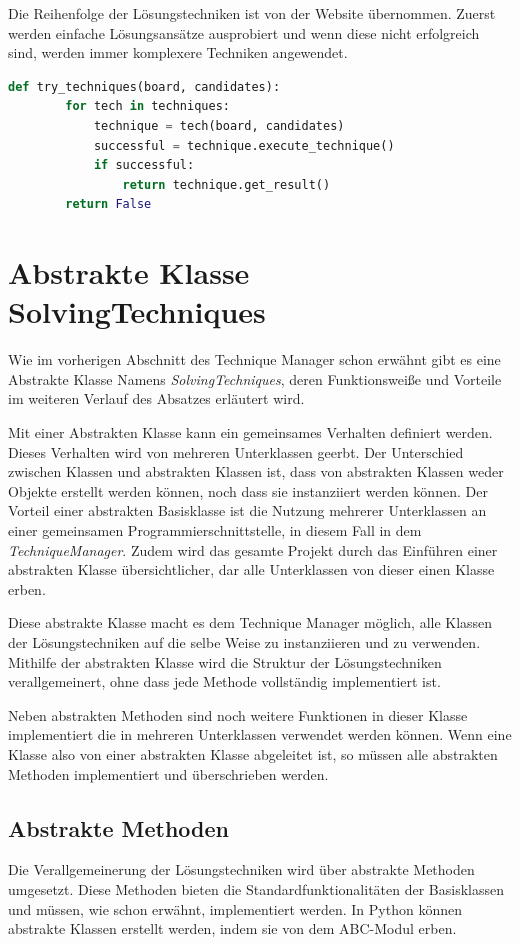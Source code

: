 Die Reihenfolge der Lösungstechniken ist von der Website \cite{martin} übernommen. Zuerst werden einfache Lösungsansätze ausprobiert und wenn diese nicht erfolgreich sind, werden immer komplexere Techniken angewendet. 

\begin{lstlisting}[language=Python, caption={Funktion um eine anwendbare Lösungstechnik zu finden}, label={lst:try}]
	def try_techniques(board, candidates):
		for tech in techniques:
			technique = tech(board, candidates)
			successful = technique.execute_technique()
			if successful:
				return technique.get_result()
		return False
\end{lstlisting}

\section{Abstrakte Klasse SolvingTechniques}

Wie im vorherigen Abschnitt des Technique Manager schon erwähnt gibt es eine Abstrakte Klasse Namens \textit{SolvingTechniques}, deren Funktionsweiße und Vorteile im weiteren Verlauf des Absatzes erläutert wird. 

Mit einer Abstrakten Klasse kann ein gemeinsames Verhalten definiert werden. Dieses Verhalten wird von mehreren Unterklassen geerbt. Der Unterschied zwischen Klassen und abstrakten Klassen ist, dass von abstrakten Klassen weder Objekte erstellt werden können, noch dass sie instanziiert werden können. Der Vorteil einer abstrakten Basisklasse ist die Nutzung mehrerer Unterklassen an einer gemeinsamen Programmierschnittstelle, in diesem Fall in dem \textit{TechniqueManager}. Zudem wird das gesamte Projekt durch das Einführen einer abstrakten Klasse übersichtlicher, dar alle Unterklassen von dieser einen Klasse erben.

Diese abstrakte Klasse macht es dem Technique Manager möglich, alle Klassen der Lösungstechniken auf die selbe Weise zu instanziieren und zu verwenden. Mithilfe der abstrakten Klasse wird die Struktur der Lösungstechniken verallgemeinert, ohne dass jede Methode vollständig implementiert ist. 

Neben abstrakten Methoden sind noch weitere Funktionen in dieser Klasse implementiert die in mehreren Unterklassen verwendet werden können. Wenn eine Klasse also von einer abstrakten Klasse abgeleitet ist, so müssen alle abstrakten Methoden implementiert und überschrieben werden. 

\subsection{Abstrakte Methoden}
Die Verallgemeinerung der Lösungstechniken wird über abstrakte Methoden umgesetzt. Diese Methoden bieten die Standardfunktionalitäten der Basisklassen und müssen, wie schon erwähnt, implementiert werden. In Python können abstrakte Klassen erstellt werden, indem sie von dem ABC-Modul erben.

